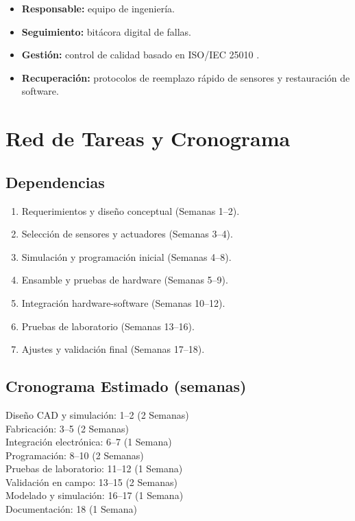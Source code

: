 \documentclass[conference]{IEEEtran}
\begin{document}
	\begin{itemize}
		\item \textbf{Responsable:} equipo de ingeniería.
		\item \textbf{Seguimiento:} bitácora digital de fallas.
		\item \textbf{Gestión:} control de calidad basado en ISO/IEC 25010 \cite{b24}.
		\item \textbf{Recuperación:} protocolos de reemplazo rápido de sensores y restauración de software\cite{b25}.
	\end{itemize}
	
	\section{Red de Tareas y Cronograma}
	
	\subsection{Dependencias}
	
	\begin{enumerate}
		\item Requerimientos y diseño conceptual (Semanas 1--2).
		\item Selección de sensores y actuadores (Semanas 3--4).
		\item Simulación y programación inicial (Semanas 4--8).
		\item Ensamble y pruebas de hardware (Semanas 5--9).
		\item Integración hardware-software (Semanas 10--12).
		\item Pruebas de laboratorio (Semanas 13--16).
		\item Ajustes y validación final (Semanas 17--18).
	\end{enumerate}
	
	\subsection{Cronograma Estimado (semanas)}
	
Diseño CAD y simulación: 1--2 (2 Semanas)\\
	Fabricación: 3--5 (2 Semanas)\\
	Integración electrónica: 6--7 (1 Semana)\\
	Programación: 8--10 (2 Semanas)\\
	Pruebas de laboratorio: 11--12 (1 Semana)\\
	Validación en campo: 13--15 (2 Semanas)\\
	Modelado y simulación: 16--17 (1 Semana)\\
	Documentación: 18 (1 Semana)
	
\end{document}
